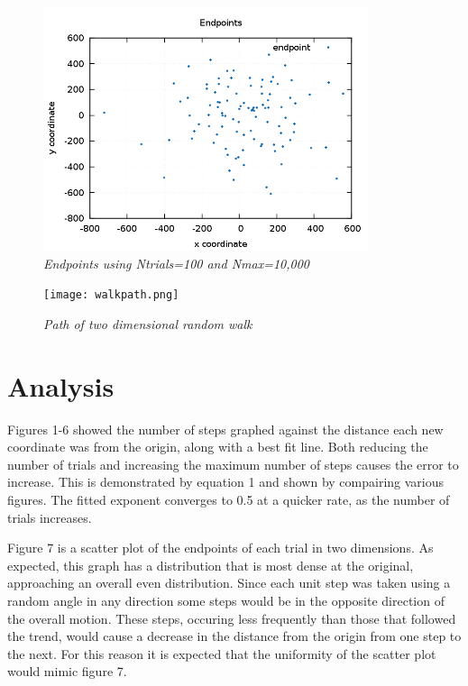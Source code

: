 \documentclass[11pt]{article}
\begin{document}
\begin{figure}[H]
  \begin{center}
\centerline{\includegraphics[width=3.75in]{endpoints.png}}
\caption{\it \small{Endpoints using Ntrials=100 and Nmax=10,000 \label{fig7}}}
  \end{center}
\end{figure}

\begin{figure}[H]
  \begin{center}
\centerline{\texttt{[image: walkpath.png]}}
\caption{\it \small{Path of two dimensional random walk \label{fig8}}}
  \end{center}
\end{figure}


\section{Analysis}

Figures 1-6 showed the number of steps graphed against the distance each new coordinate was from the origin, along 
with a best fit line.  Both reducing the number of trials and increasing the maximum number of steps causes the 
error to increase.  This is demonstrated by equation 1 and shown by compairing various figures.  The fitted 
exponent converges to 0.5 at a quicker rate, as the number of trials increases.

Figure 7 is a scatter plot of the endpoints of each trial in two dimensions.  As expected, this graph has a 
distribution that is most dense at the original, approaching an overall even distribution.  Since each unit step 
was taken using a random angle in any direction some steps would be in the opposite direction of the overall motion.  
These steps, occuring less frequently than those that followed the trend, would cause a decrease in the distance 
from the origin from one step to the next.  For this reason it is expected that the uniformity of the scatter plot 
would mimic figure 7.
\end{document}
